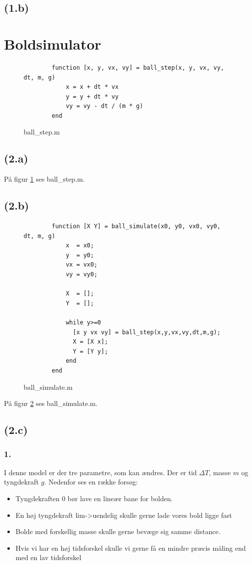 \documentclass{article}
\begin{document}
\subsection*{(1.b)}

\section{Boldsimulator}

\begin{figure}
	\begin{verbatim}
		function [x, y, vx, vy] = ball_step(x, y, vx, vy, dt, m, g)
		    x = x + dt * vx
		    y = y + dt * vy
		    vy = vy - dt / (m * g)
		end
	\end{verbatim}
	\caption{ball\_step.m}
	\label{ballsinmyass}
\end{figure}

\subsection*{(2.a)}
På figur \ref{ballsinmyass} ses ball\_step.m.

\subsection*{(2.b)}
\begin{figure}
	\begin{verbatim}
		function [X Y] = ball_simulate(x0, y0, vx0, vy0, dt, m, g)
			x  = x0;
			y  = y0;
			vx = vx0;
			vy = vy0;

			X  = [];
			Y  = [];

			while y>=0
			  [x y vx vy] = ball_step(x,y,vx,vy,dt,m,g);
			  X = [X x];
			  Y = [Y y];
			end
		end
	\end{verbatim}
	\caption{ball\_simulate.m}
	\label{ballsims}
\end{figure}

På figur \ref{ballsims} ses ball\_simulate.m.

\subsection*{(2.c)}

\subsubsection*{1.}

I denne model er der tre parametre, som kan ændres. Der er tid $\Delta T$, masse $m$ og tyngdekraft $g$. Nedenfor ses en række forsøg:
\begin{itemize}
	\item Tyngdekraften 0 bør lave en lineær bane for bolden.
	\item En høj tyngdekraft lim->uendelig skulle gerne lade vores bold ligge fast
	\item Bolde med forskellig masse skulle gerne bevæge sig samme distance.
	\item Hvis vi har en høj tidsforskel skulle vi gerne få en mindre præcis måling end med en lav tidsforskel
\end{itemize}
\end{document}
